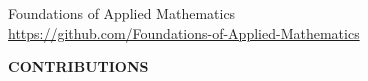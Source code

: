 \newpage 
\setcounter{page}{1}
\thispagestyle{empty}
\vspace{-3em}

\vspace{-2em}

\begin{center}
 {\fontsize{24pt}{22pt}\selectfont \textcolor{titletextcolour}{Foundations of Applied Mathematics}} \\ 
{\fontsize{16pt}{20pt}\selectfont \textcolor{titlemainbgcolour}{\url{https://github.com/Foundations-of-Applied-Mathematics}}} 
\end{center}

\setlength{\parskip}{0pt}

\vfill





\begin{center}
\fontsize{14pt}{16pt}\selectfont\textcolor{titletextcolour}{\textbf{CONTRIBUTIONS}}
\end{center}



